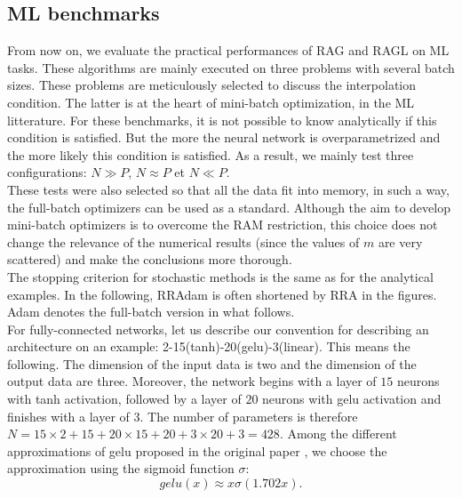 \subsection{ML benchmarks}
\label{ML_benchs}

From now on, we evaluate the practical performances of RAG and RAGL on ML tasks. These algorithms are mainly executed on three problems with several batch sizes. These problems are
meticulously selected to discuss the interpolation condition. The latter is at the heart of mini-batch optimization, in the ML litterature. For these benchmarks, it is not possible
to know analytically if this condition is satisfied. But the more the neural network is overparametrized and the more likely this condition is satisfied. As a result, we mainly test three configurations: $N\gg P$, $N\approx P$ et $N\ll P$. \\
These tests were also selected so that all the data fit into memory, in such a way, the full-batch optimizers can be used as a standard. Although the aim to develop mini-batch
optimizers is to overcome the RAM restriction, this choice does not change the relevance of the numerical results (since the values of $m$ are very scattered) and make the
conclusions more thorough.\\ 
The stopping criterion for stochastic methods is the same as for the analytical examples. In the following, RRAdam is often shortened by RRA in the figures. Adam denotes the full-batch version in what follows. \\
For fully-connected networks, let us describe our convention for describing an architecture on an example: 2-15(tanh)-20(gelu)-3(linear). This means the following. The dimension of the input data is two and the dimension of the output data are three. Moreover, the network begins with a layer of $15$ neurons with tanh activation, followed by a layer of $20$ neurons with gelu activation \cite{gelu} and finishes with a layer of $3$. The number of parameters is therefore $N=15\times 2 + 15 + 20\times 15 + 20 + 3\times 20 + 3 = 428$.
Among the different approximations of gelu proposed in the original paper \cite{gelu}, we choose the approximation using the sigmoid function $\sigma$:
\begin{equation*}
	gelu(x) \approx x\sigma(1.702x).
\end{equation*}
